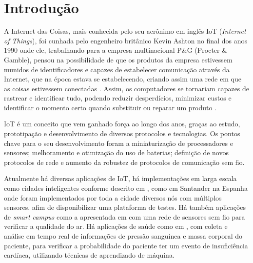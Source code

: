 \chapter[Introdução]{Introdução}
\label{cap:intro}

A Internet das Coisas, mais conhecida pelo seu acrônimo em inglês IoT (\emph{Internet of Things}), foi cunhada pelo engenheiro britânico Kevin Ashton no final dos anos 1990 onde ele, trabalhando para a empresa multinacional P\&G (Procter \& Gamble), pensou na possibilidade de que os produtos da empresa estivessem munidos de identificadores e capazes de estabelecer comunicação através da Internet, que na época estava se estabelecendo, criando assim uma rede em que as coisas estivessem conectadas \cite{KA_IOT}. Assim, os computadores se tornariam capazes de rastrear e identificar tudo, podendo reduzir desperdícios, minimizar custos e identificar o momento certo quando substituir ou reparar um produto \cite{lopezIOT}.

IoT é um conceito que vem ganhado força ao longo dos anos, graças ao estudo, prototipação e desenvolvimento de diversos protocolos e tecnologias. Os pontos chave para o seu desenvolvimento foram a miniaturização de processadores e sensores; melhoramento e otimização do uso de baterias; definição de novos protocolos de rede e aumento da robustez de protocolos de comunicação sem fio.

Atualmente há diversas aplicações de IoT, há implementações em larga escala como cidades inteligentes conforme descrito em \cite{sotres2017practical}, como em Santander na Espanha onde foram implementados por toda a cidade diversos nós com múltiplos sensores, afim de disponibilizar uma plataforma de testes. Há também aplicações de \emph{smart campus} como a apresentada em \cite{wang2017performance} com uma rede de sensores sem fio para verificar a qualidade do ar. Há aplicações de saúde como em \cite{zhang2015remote}, com coleta e análise em tempo real de informações de pressão sanguínea e massa corporal do paciente, para verificar a probabilidade do paciente ter um evento de insuficiência cardíaca, utilizando técnicas de aprendizado de máquina.


